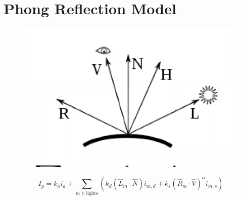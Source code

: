 \section{Phong Reflection Model}

\begin{figure}[H]
  \centering
  \includegraphics[width=0.7\columnwidth]{images/shading/phong.png}
\end{figure}

\begin{equation}
  I_{p} = k_{a} i_{a} +
  \sum_{m \in \text{lights}}
  \left(
    k_{d} \left( \hat{L}_{m} \cdot \hat{N} \right) i_{m, d} +
    k_{s} \left( \hat{R}_{m} \cdot \hat{V} \right)^{\alpha} i_{m, s}
  \right)
\end{equation}

